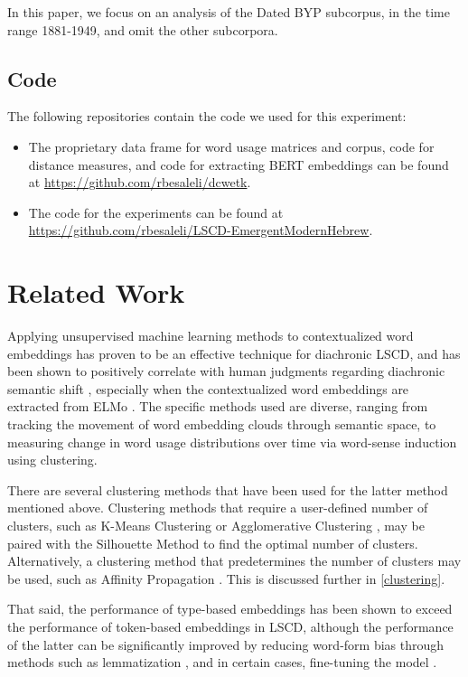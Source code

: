 \documentclass[10pt, a4paper]{article}
\begin{document}
In this paper, we focus on an analysis of the Dated BYP subcorpus, in the time range 1881-1949, and omit the other subcorpora.
\subsection{Code}
The following repositories contain the code we used for this experiment:
\begin{itemize}
    \item The proprietary data frame for word usage matrices and corpus, code for distance measures, and code for extracting BERT embeddings can be found at \href{https://github.com/rbesaleli/dcwetk}{https://github.com/rbesaleli/dcwetk}.
    \item The code for the experiments can be found at \href{https://github.com/rbesaleli/LSCD-EmergentModernHebrew}{https://github.com/rbesaleli/LSCD-EmergentModernHebrew}.
\end{itemize}
\section{Related Work}
Applying unsupervised machine learning methods to contextualized word embeddings has proven to be an effective technique for diachronic LSCD, and has been shown to positively correlate with human judgments regarding diachronic semantic shift \cite{Giulianelli2020,Kutuzov2020}, especially when the contextualized word embeddings are extracted from ELMo \cite{Kutuzov2020}. The specific methods used are diverse, ranging from tracking the movement of word embedding clouds through semantic space, to measuring change in word usage distributions over time via word-sense induction using clustering.

There are several clustering methods that have been used for the latter method mentioned above. Clustering methods that require a user-defined number of clusters, such as K-Means Clustering \cite{Giulianelli2020} or Agglomerative Clustering \cite{Laicher2021}, may be paired with the Silhouette Method to find the optimal number of clusters. Alternatively, a clustering method that predetermines the number of clusters may be used, such as Affinity Propagation \cite{Martinc2020,Kutuzov2020}. This is discussed further in \ref{clustering}.

That said, the performance of type-based embeddings has been shown to exceed the performance of token-based embeddings in LSCD, although the performance of the latter can be significantly improved by reducing word-form bias through methods such as lemmatization \cite{Laicher2021}, and in certain cases, fine-tuning the model \cite{Martinc2020}. 
\end{document}
